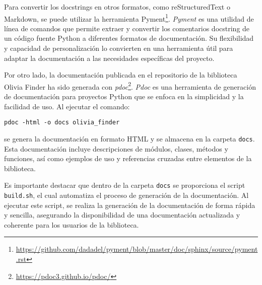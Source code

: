 Para convertir los docstrings en otros formatos, como reStructuredText o Markdown, se puede utilizar la 
herramienta Pyment\footnote{\url{https://github.com/dadadel/pyment/blob/master/doc/sphinx/source/pyment.rst}}. \textit{Pyment} es una utilidad de línea de comandos 
que permite extraer y convertir los comentarios docstring de un código fuente Python a diferentes formatos 
de documentación. Su flexibilidad y capacidad de personalización lo convierten en una herramienta útil 
para adaptar la documentación a las necesidades específicas del proyecto.

Por otro lado, la documentación publicada en el repositorio de la biblioteca Olivia Finder ha sido generada 
con \textit{pdoc}\footnote{\url{https://pdoc3.github.io/pdoc/}}. \textit{Pdoc} es una herramienta de generación de documentación 
para proyectos Python que se enfoca en la simplicidad y la facilidad de uso. Al ejecutar el comando:

\begin{center}
    \texttt{pdoc -html -o docs olivia\_finder}
\end{center}

se genera la documentación en formato HTML y se almacena en la 
carpeta \texttt{docs}. Esta documentación incluye descripciones de módulos, clases, métodos y funciones,
 así como ejemplos de uso y referencias cruzadas entre elementos de la biblioteca.

Es importante destacar que dentro de la carpeta \texttt{docs} se proporciona el script \texttt{build.sh}, 
el cual automatiza el proceso de generación de la documentación. Al ejecutar este script, se realiza la 
generación de la documentación de forma rápida y sencilla, asegurando la disponibilidad de una documentación 
actualizada y coherente para los usuarios de la biblioteca.